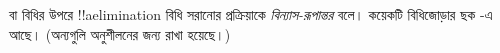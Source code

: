 \documentclass[../../../include/open-logic-section]{subfiles}
\begin{document}
\Elim{\lor} বা \Elim{\lexists}
বিধির উপরে !!a{elimination}
বিধি সরানোর প্রক্রিয়াকে
\emph{বিন্যাস-রূপান্তর} বলে।
কয়েকটি বিধিজোড়ার ছক
-এ
আছে। (অন্যগুলি অনুশীলনের জন্য
রাখা হয়েছে।)

\end{document}
